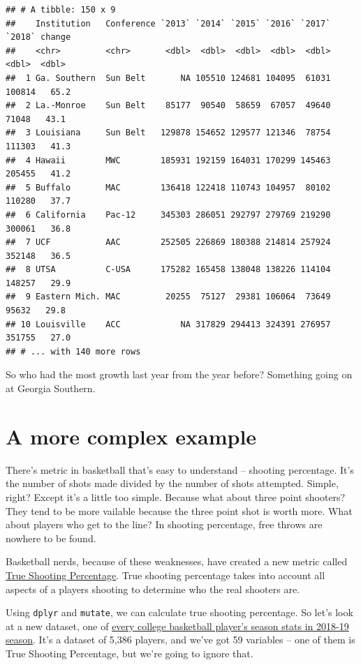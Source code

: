 \documentclass[
]{book}
\begin{document}
\begin{verbatim}
## # A tibble: 150 x 9
##    Institution   Conference `2013` `2014` `2015` `2016` `2017` `2018` change
##    <chr>         <chr>       <dbl>  <dbl>  <dbl>  <dbl>  <dbl>  <dbl>  <dbl>
##  1 Ga. Southern  Sun Belt       NA 105510 124681 104095  61031 100814   65.2
##  2 La.-Monroe    Sun Belt    85177  90540  58659  67057  49640  71048   43.1
##  3 Louisiana     Sun Belt   129878 154652 129577 121346  78754 111303   41.3
##  4 Hawaii        MWC        185931 192159 164031 170299 145463 205455   41.2
##  5 Buffalo       MAC        136418 122418 110743 104957  80102 110280   37.7
##  6 California    Pac-12     345303 286051 292797 279769 219290 300061   36.8
##  7 UCF           AAC        252505 226869 180388 214814 257924 352148   36.5
##  8 UTSA          C-USA      175282 165458 138048 138226 114104 148257   29.9
##  9 Eastern Mich. MAC         20255  75127  29381 106064  73649  95632   29.8
## 10 Louisville    ACC            NA 317829 294413 324391 276957 351755   27.0
## # ... with 140 more rows
\end{verbatim}

So who had the most growth last year from the year before? Something going on at Georgia Southern.

\hypertarget{a-more-complex-example}{%
\section{A more complex example}\label{a-more-complex-example}}

There's metric in basketball that's easy to understand -- shooting percentage. It's the number of shots made divided by the number of shots attempted. Simple, right? Except it's a little too simple. Because what about three point shooters? They tend to be more vailable because the three point shot is worth more. What about players who get to the line? In shooting percentage, free throws are nowhere to be found.

Basketball nerds, because of these weaknesses, have created a new metric called \href{https://en.wikipedia.org/wiki/True_shooting_percentage}{True Shooting Percentage}. True shooting percentage takes into account all aspects of a players shooting to determine who the real shooters are.

Using \texttt{dplyr} and \texttt{mutate}, we can calculate true shooting percentage. So let's look at a new dataset, one of \href{https://unl.box.com/s/u99ualyzrrzucunr9edd3m4gvgvorez6}{every college basketball player's season stats in 2018-19 season}. It's a dataset of 5,386 players, and we've got 59 variables -- one of them is True Shooting Percentage, but we're going to ignore that.
\end{document}
